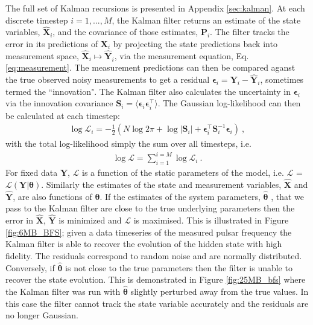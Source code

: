 \documentclass[fleqn,usenatbib,useAMS]{mnras}
\begin{document}
The full set of Kalman recursions is presented in Appendix \ref{sec:kalman}. At each discrete timestep $i = 1, ... , M$, the Kalman filter returns an estimate of the state variables, $\hat{\boldsymbol{X}}_i$, and the covariance of those estimates, $\boldsymbol{P}_i$. The filter tracks the error in its predictions of $\boldsymbol{X}_i$ by projecting the state predictions back into measurement space, $\hat{\boldsymbol{X}}_i \mapsto \hat{\boldsymbol{Y}}_i$, via the measurement equation, Eq. \ref{eq:measurement}. The measurement predictions can then be compared aganst the true observed noisy measurements to get a residual $\boldsymbol{\epsilon}_i = \boldsymbol{Y}_i  - \hat{\boldsymbol{Y}}_i$, sometimes termed the ``innovation". The Kalman filter also calculates the uncertainty in $\boldsymbol{\epsilon}_i$ via the innovation covariance $\boldsymbol{S}_i = \langle \boldsymbol{\epsilon}_i \boldsymbol{\epsilon}_i^{\intercal} \rangle$. The Gaussian log-likelihood can then be calculated at each timestep:
\begin{eqnarray}
	\log \mathcal{L}_i =  -\frac{1}{2} \left (N \log 2 \pi + \log  \left | \boldsymbol{S}_i \right | + \boldsymbol{\epsilon}_i^{\intercal} \boldsymbol{S}_i^{-1}  \boldsymbol{\epsilon}_i \right ) \ ,
\end{eqnarray}
with the total log-likelihood simply the sum over all timesteps, i.e. 
\begin{eqnarray}
	\log \mathcal{L} =  \sum_{i=1}^{i=M} \log \mathcal{L}_i \ . \label{eq:likelihood}
\end{eqnarray}
For fixed data $\boldsymbol{Y}$, $\mathcal{L}$ is a function of the static parameters of the model, i.e. $\mathcal{L}$ = $\mathcal{L}(\boldsymbol{Y} | \boldsymbol{\theta})$. Similarly the estimates of the state and measurement variables, $\hat{\boldsymbol{X}}$ and $\hat{\boldsymbol{Y}}$, are also functions of $\boldsymbol{\theta}$. If the estimates of the system parameters, $\boldsymbol{\hat{\theta}}$ , that we pass to the Kalman filter are close to the true underlying parameters then the error in $\hat{\boldsymbol{X}}$, $\hat{\boldsymbol{Y}}$ is minimized and $\mathcal{L}$ is maximised. This is illustrated in Figure \ref{fig:6MB_BFS}; given a data timeseries of the measured pulsar frequency the Kalman filter is able to recover the evolution of the hidden state with high fidelity. The residuals correspond to random noise and are normally distributed. Conversely, if $\boldsymbol{\hat{\theta}}$ is not close to the true parameters then the filter is unable to recover the state evolution. This is demonstrated in Figure \ref{fig:25MB_bfs} where the Kalman filter was run with $\boldsymbol{\hat{\theta}}$ slightly perturbed away from the true values. In this case the filter cannot track the state variable accurately and the residuals are no longer Gaussian.
\end{document}
